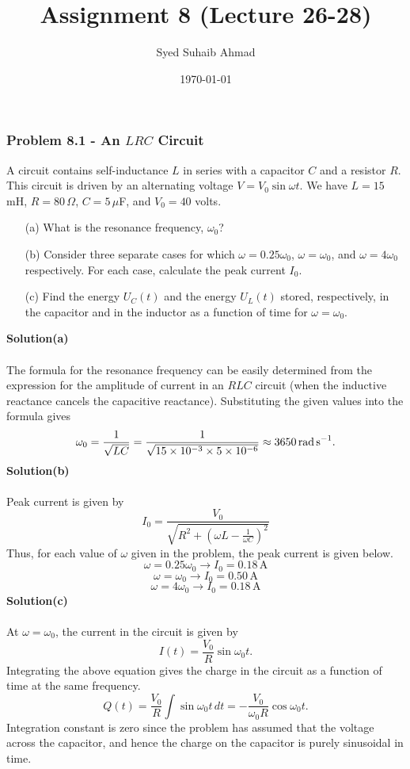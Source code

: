 \documentclass{article}
\title{Assignment \textbf{8} (Lecture 26-28)
}
\author{Syed Suhaib Ahmad}
\date{\today}
\begin{document}
\maketitle


\subsubsection*{Problem 8.1 - An $LRC$ Circuit}
A circuit contains self-inductance $L$ in series with a capacitor $C$ and a resistor $R$. This circuit is driven by an alternating voltage $V=V_0\sin\omega t$. We have $L=15\,$mH, $R=80\,\Omega$, $C=5\,\mu$F, and $V_0=40$ volts.
\begin{enumerate}
    \item[(a)]What is the resonance frequency, $\omega_0$?
    \item[(b)]Consider three separate cases for which $\omega=0.25\omega_0$, $\omega=\omega_0$, and $\omega=4\omega_0$ respectively. For each case, calculate the peak current $I_0$.
    \item[(c)]Find the energy $U_C(t)$ and the energy $U_L(t)$ stored, respectively, in the capacitor and in the inductor as a function of time for $\omega=\omega_0$.
\end{enumerate}
\textbf{Solution(a)}
\\
\\The formula for the resonance frequency can be easily determined from the expression for the amplitude of current in an $RLC$ circuit (when the inductive reactance cancels the capacitive reactance). Substituting the given values into the formula gives
\[\omega_0=\frac{1}{\sqrt{LC}}=\frac{1}{\sqrt{15\times10^{-3}\times5\times10^{-6}}}\approx3650\,\text{rad\,s}^{-1}.\]
\textbf{Solution(b)}
\\
\\Peak current is given by
\begin{equation}
    I_0=\frac{V_0}{\sqrt{R^2+\left(\omega L-\frac{1}{\omega C}\right)^2}}
\end{equation}
Thus, for each value of $\omega$ given in the problem, the peak current is given below.
\[\omega=0.25\omega_0\longrightarrow I_0=0.18\,\text{A}\]
\[\omega=\omega_0\longrightarrow I_0=0.50\,\text{A}\]
\[\omega=4\omega_0\longrightarrow I_0=0.18\,\text{A}\]
\textbf{Solution(c)}
\\
\\At $\omega=\omega_0$, the current in the circuit is given by
\[I(t)=\frac{V_0}{R}\sin\omega_0t.\]
Integrating the above equation gives the charge in the circuit as a function of time at the same frequency.
\[Q(t)=\frac{V_0}{R}\int\sin\omega_0t\,dt=-\frac{V_0}{\omega_0R}\cos\omega_0t.\]
Integration constant is zero since the problem has assumed that the voltage across the capacitor, and hence the charge on the capacitor is purely sinusoidal in time.
\end{document}
